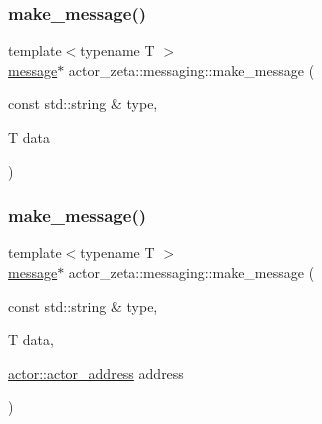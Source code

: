 \mbox{\label{namespaceactor__zeta_1_1messaging_a21ea28d14db328e347552fa3943410bf}} 
\subsubsection{\texorpdfstring{make\+\_\+message()}{make\_message()}\hspace{0.1cm}{\footnotesize\ttfamily [2/4]}}
{\footnotesize\ttfamily template$<$typename T $>$ \\
\hyperlink{classactor__zeta_1_1messaging_1_1message}{message}$\ast$ actor\+\_\+zeta\+::messaging\+::make\+\_\+message (\begin{DoxyParamCaption}\item[{const std\+::string \&}]{type,  }\item[{T}]{data }\end{DoxyParamCaption})\hspace{0.3cm}{\ttfamily [inline]}}

\mbox{\label{namespaceactor__zeta_1_1messaging_a81fe08e3ae76ca8eec5eb6f59f3912ba}} 
\subsubsection{\texorpdfstring{make\+\_\+message()}{make\_message()}\hspace{0.1cm}{\footnotesize\ttfamily [3/4]}}
{\footnotesize\ttfamily template$<$typename T $>$ \\
\hyperlink{classactor__zeta_1_1messaging_1_1message}{message}$\ast$ actor\+\_\+zeta\+::messaging\+::make\+\_\+message (\begin{DoxyParamCaption}\item[{const std\+::string \&}]{type,  }\item[{T}]{data,  }\item[{\hyperlink{classactor__zeta_1_1actor_1_1actor__address}{actor\+::actor\+\_\+address}}]{address }\end{DoxyParamCaption})\hspace{0.3cm}{\ttfamily [inline]}}

